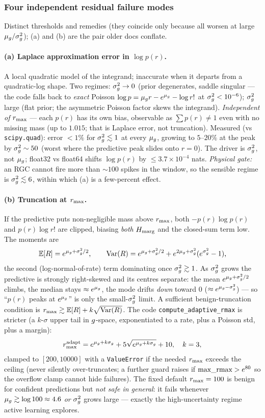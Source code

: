 \subsubsection{Four independent residual failure modes}
Distinct thresholds and remedies (they coincide only because all worsen at large
$\mu_{g}/\sigma_{g}^{2}$); (a) and (b) are the pair older docs conflate.

\paragraph{(a) Laplace approximation error in $\log p(r)$.} A local quadratic
model of the integrand; inaccurate when it departs from a quadratic-log shape.
Two regimes: $\sigma_{g}^{2}\to0$ (prior degenerates, saddle singular --- the code falls
back to \emph{exact} Poisson $\log p=\mu_{g} r-e^{\mu_{g}}-\log r!$ at $\sigma_{g}^{2}<10^{-6}$);
$\sigma_{g}^{2}$ large (flat prior; the asymmetric Poisson factor skews the integrand).
\emph{Independent of $r_{\max}$} --- each $p(r)$ has its own bias, observable as
$\sum p(r)\neq1$ even with no missing mass (up to $1.015$; that is Laplace error,
not truncation). Measured (vs \texttt{scipy.quad}): error $<1\%$ for $\sigma_{g}^{2}\lesssim1$
at every $\mu_{g}$, growing to $5$--$20\%$ at the peak by $\sigma_{g}^{2}\sim50$ (worst where
the predictive peak slides onto $r=0$). The driver is $\sigma_{g}^{2}$, not $\mu_{g}$; float32
vs float64 shifts $\log p(r)$ by $\le3.7\times10^{-4}$ nats. \emph{Physical gate:}
an RGC cannot fire more than $\sim100$ spikes in the window, so the sensible regime
is $\sigma_{g}^{2}\lesssim6$, within which (a) is a few-percent effect.

\paragraph{(b) Truncation at $r_{\max}$.} If the predictive puts non-negligible mass
above $r_{\max}$, both $-p(r)\log p(r)$ and $p(r)\log r!$ are clipped, biasing
\emph{both} $H_{\mathrm{marg}}$ and the closed-sum term low. The moments are
\[
  \mathbb{E}[R]=e^{\mu_{g}+\sigma_{g}^{2}/2},\qquad
  \mathrm{Var}(R)=e^{\mu_{g}+\sigma_{g}^{2}/2}+e^{2\mu_{g}+\sigma_{g}^{2}}(e^{\sigma_{g}^{2}}-1),
\]
the second (log-normal-of-rate) term dominating once $\sigma_{g}^{2}\gtrsim1$. As $\sigma_{g}^{2}$
grows the predictive is strongly right-skewed and its centres separate: the mean
$e^{\mu_{g}+\sigma_{g}^{2}/2}$ climbs, the median stays $\approx e^{\mu_{g}}$, the mode drifts
\emph{down} toward $0$ ($\approx e^{\mu_{g}-\sigma_{g}^{2}}$) --- so ``$p(r)$ peaks at
$e^{\mu_{g}}$'' is only the small-$\sigma_{g}^{2}$ limit. A sufficient benign-truncation
condition is $r_{\max}\gtrsim\mathbb{E}[R]+k\sqrt{\mathrm{Var}(R)}$. The code
\texttt{compute\_\allowbreak adaptive\_\allowbreak rmax} is stricter (a $k$-$\sigma$ upper tail in
$g$-space, exponentiated to a rate, plus a Poisson std, plus a margin):
\[
  r_{\max}^{\mathrm{adapt}}=e^{\mu_{g}+k\sigma_g}+5\sqrt{e^{\mu_{g}+k\sigma_g}}+10,\quad k=3,
\]
clamped to $[200,10000]$ with a \texttt{ValueError} if the needed $r_{\max}$ exceeds
the ceiling (never silently over-truncates; a further guard raises if
$\text{max\_\allowbreak rmax}>e^{80}$ so the overflow clamp cannot hide failures). The fixed
default $r_{\max}=100$ is benign for confident predictions but \emph{not safe in
general}: it fails whenever $\mu_{g}\gtrsim\log100\approx4.6$ \emph{or} $\sigma_{g}^{2}$ grows
large --- exactly the high-uncertainty regime active learning explores.

